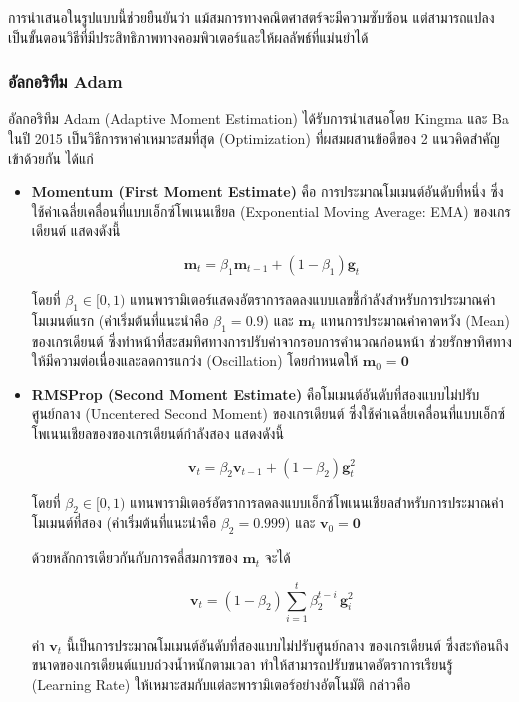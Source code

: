 การนำเสนอในรูปแบบนี้ช่วยยืนยันว่า แม้สมการทางคณิตศาสตร์จะมีความซับซ้อน แต่สามารถแปลงเป็นขั้นตอนวิธีที่มีประสิทธิภาพทางคอมพิวเตอร์และให้ผลลัพธ์ที่แม่นยำได้

\subsubsection{อัลกอริทึม Adam}

อัลกอริทึม Adam (Adaptive Moment Estimation) ได้รับการนำเสนอโดย Kingma และ Ba ในปี 2015 เป็นวิธีการหาค่าเหมาะสมที่สุด (Optimization) ที่ผสมผสานข้อดีของ 2 แนวคิดสำคัญเข้าด้วยกัน ได้แก่ 

\begin{itemize}
	\item \textbf{Momentum (First Moment Estimate)} คือ การประมาณโมเมนต์อันดับที่หนึ่ง ซึ่งใช้ค่าเฉลี่ยเคลื่อนที่แบบเอ็กซ์โพเนนเชียล (Exponential Moving Average: EMA) ของเกรเดียนต์ แสดงดังนี้

	$$\mathbf{m}_t = \beta_1 \mathbf{m}_{t-1} + (1 - \beta_1)\mathbf{g}_t$$

	โดยที่ $\beta_1 \in [0, 1)$ แทนพารามิเตอร์แสดงอัตราการลดลงแบบเลขชี้กำลังสำหรับการประมาณค่าโมเมนต์แรก (ค่าเริ่มต้นที่แนะนำคือ $\beta_1 = 0.9$) และ $\mathbf{m}_t$ แทนการประมาณค่าคาดหวัง (Mean) ของเกรเดียนต์ ซึ่งทำหน้าที่สะสมทิศทางการปรับค่าจากรอบการคำนวณก่อนหน้า ช่วยรักษาทิศทางให้มีความต่อเนื่องและลดการแกว่ง (Oscillation) โดยกำหนดให้ $\mathbf{m}_0 = \mathbf{0}$



	\item \textbf{RMSProp (Second Moment Estimate)} คือโมเมนต์อันดับที่สองแบบไม่ปรับศูนย์กลาง (Uncentered Second Moment) ของเกรเดียนต์ ซึ่งใช้ค่าเฉลี่ยเคลื่อนที่แบบเอ็กซ์โพเนนเชียลของของเกรเดียนต์กำลังสอง แสดงดังนี้

	$$\mathbf{v}_t = \beta_2 \mathbf{v}_{t-1} + (1 - \beta_2)\mathbf{g}_t^2$$

	โดยที่ $\beta_2 \in [0, 1)$ แทนพารามิเตอร์อัตราการลดลงแบบเอ็กซ์โพเนนเชียลสำหรับการประมาณค่าโมเมนต์ที่สอง (ค่าเริ่มต้นที่แนะนำคือ $\beta_2 = 0.999$) และ $\mathbf{v}_0 = \mathbf{0}$

	\noindent
	ด้วยหลักการเดียวกันกับการคลี่สมการของ $\mathbf{m}_t$ จะได้

	$$\mathbf{v}_t = (1-\beta_2)\sum_{i=1}^{t}\beta_2^{t-i}\,\mathbf{g}_i^2$$

	\noindent
	ค่า $\mathbf{v}_t$ นี้เป็นการประมาณโมเมนต์อันดับที่สองแบบไม่ปรับศูนย์กลาง ของเกรเดียนต์ ซึ่งสะท้อนถึงขนาดของเกรเดียนต์แบบถ่วงน้ำหนักตามเวลา ทำให้สามารถปรับขนาดอัตราการเรียนรู้ (Learning Rate) ให้เหมาะสมกับแต่ละพารามิเตอร์อย่างอัตโนมัติ กล่าวคือ


\end{itemize}
